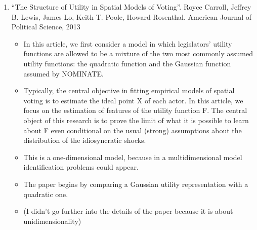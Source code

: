 \documentclass[a4paper,12pt]{article}
\begin{document}
\begin{enumerate}
\newpage


\item “The Structure of Utility in Spatial Models of Voting”. Royce Carroll, Jeffrey B. Lewis, James Lo, Keith T. Poole, Howard Rosenthal. American Journal of Political Science, 2013   
\begin{itemize}
\item In this article, we first consider a model in which legislators' utility functions are allowed to be a mixture of the two most commonly assumed utility functions: the quadratic function and the Gaussian function assumed by NOMINATE.
\item Typically, the central objective in fitting empirical models of spatial voting is to estimate the ideal point X of each actor. In this article, we focus on the estimation of features of the utility function F. The central object of this research is to prove the limit of what it is possible to learn about F even conditional on the usual (strong) assumptions about the distribution of the idiosyncratic shocks. 
\item This is a one-dimensional model, because in a multidimensional model identification problems could appear.  
\item The paper begins by comparing a Gaussian utility representation with a quadratic one.  
\item (I didn’t go further into the details of the paper because it is about unidimensionality) 
\end{itemize}



\newpage



\end{enumerate}
\end{document}
